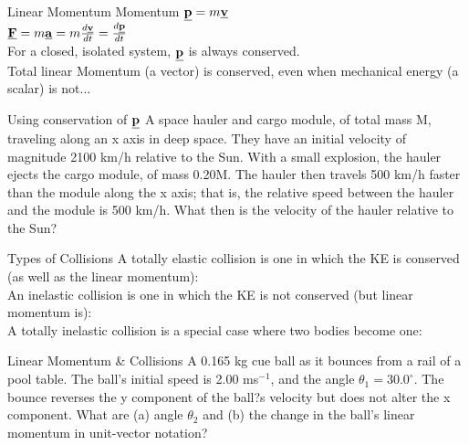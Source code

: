 \begin{frame}{Linear Momentum }
\small
Momentum $ \underline{\mathbf{p}} = m \underline{\mathbf{v}} $\\[1ex]
$ \underline{\mathbf{F}} = m \underline{\mathbf{a}} = m\frac{d\underline{\mathbf{v}} }{dt} = \frac{d\underline{\mathbf{p}} }{dt}$ \\[2ex]

For a closed, isolated system, $\underline{\mathbf{p}}$ is always conserved.\\[1ex]

Total linear Momentum (a vector) is conserved, even when mechanical energy (a scalar) is not...\\
  
\vspace{10cm}
\end{frame}



\begin{frame}{Using conservation of $\underline{\mathbf{p}}$ }
\small
A space hauler and cargo module, of total mass M, traveling along an x axis in deep space. They have an initial velocity of magnitude 2100 km/h relative to the Sun. With a small explosion, the hauler ejects the cargo module, of mass 0.20M. The hauler then travels 500 km/h faster than the module along the x axis; that is, the relative speed between the hauler and the module is 500 km/h. What then is the velocity of the hauler relative to the Sun?
\vspace{8cm}

\end{frame}

\begin{frame}{Types of Collisions}
\small
A totally elastic collision is one in which the KE is conserved  (as well as the linear momentum):\\[4ex]

An  inelastic collision is one in which the KE is not conserved  (but linear momentum is):\\[4ex]

A totally inelastic collision is a special case where two bodies become one:\\[4ex]

\end{frame}



\begin{frame}{Linear Momentum \& Collisions}
\small
A 0.165 kg cue ball as it bounces from a rail of a pool table. The ball's initial speed is 2.00 ms$^{-1}$, and the angle $\theta_1 = 30.0^{\circ}$. The bounce reverses the y component of the ball?s velocity but does not alter the x component. What are (a) angle $\theta_2$ and (b) the change in the ball's linear momentum in unit-vector notation? 
\vspace{10cm}

\end{frame}




